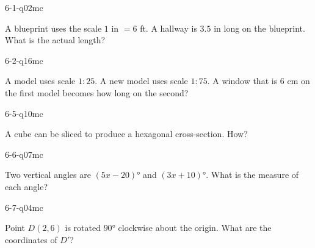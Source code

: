 \begin{practiceQuestion}{6-1-q02}{mc}
\begin{questionText}
A blueprint uses the scale $1$ in $= 6$ ft. A hallway is $3.5$ in long on the blueprint. What is the actual length?
\end{questionText}
\end{practiceQuestion}

\begin{practiceQuestion}{6-2-q16}{mc}
\begin{questionText}
A model uses scale $1:25$. A new model uses scale $1:75$. A window that is $6$ cm on the first model becomes how long on the second?
\end{questionText}
\end{practiceQuestion}

\begin{practiceQuestion}{6-5-q10}{mc}
\begin{questionText}
A cube can be sliced to produce a hexagonal cross-section. How?
\end{questionText}
\end{practiceQuestion}

\begin{practiceQuestion}{6-6-q07}{mc}
\begin{questionText}
Two vertical angles are $(5x - 20)°$ and $(3x + 10)°$. What is the measure of each angle?
\end{questionText}
\end{practiceQuestion}

\begin{practiceQuestion}{6-7-q04}{mc}
\begin{questionText}
Point $D(2, 6)$ is rotated $90°$ clockwise about the origin. What are the coordinates of $D'$?
\end{questionText}
\end{practiceQuestion}

